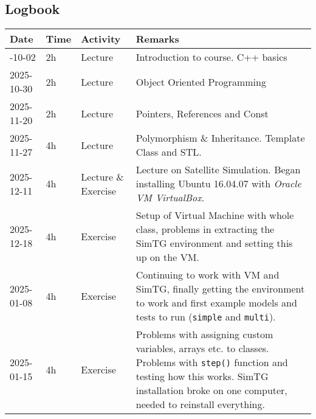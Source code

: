 \begin{appendices}

\section{Logbook}
\label{sec:logbook}

\begin{table}[H]
\centering
\tiny  
    \begin{tabularx}{\textwidth} {
    | >{\hsize=0.3\hsize}X     %
    | >{\hsize=0.2\hsize}X     %
    | >{\hsize=0.3\hsize}X      %
    | >{\hsize=2.15\hsize}X      %
    |}
    \hline
    \textbf{Date} & \textbf{Time} & \textbf{Activity} & \textbf{Remarks} \\ \hline\hline
    
        2025-10-02 & 2h & Lecture  &  Introduction to course. C++ basics \\ \hline
        
        2025-10-30 & 2h & Lecture  &   Object Oriented Programming \\ \hline
        
        2025-11-20 & 2h & Lecture  &  Pointers, References and Const \\ \hline
        
        2025-11-27 & 4h & Lecture  &  Polymorphism \& Inheritance. Template Class and STL.  \\ \hline
        
        2025-12-11 & 4h & Lecture \& Exercise  &  Lecture on Satellite Simulation. Began installing Ubuntu 16.04.07 with \textit{Oracle VM VirtualBox}. \\ \hline
        
        2025-12-18 & 4h & Exercise &  Setup of Virtual Machine with whole class, problems in extracting the SimTG environment and setting this up on the VM. \\ \hline
        
        2025-01-08 & 4h & Exercise &  Continuing to work with VM and SimTG, finally getting the environment to work and first example models and tests to run (\texttt{simple} and \texttt{multi}).  \\ \hline

        2025-01-15 & 4h & Exercise &  Problems with assigning custom variables, arrays etc. to classes. Problems with \texttt{step()} function and testing how this works. SimTG installation broke on one computer, needed to reinstall everything. \\ \hline
        

\end{tabularx}
\end{table}
\end{appendices}
